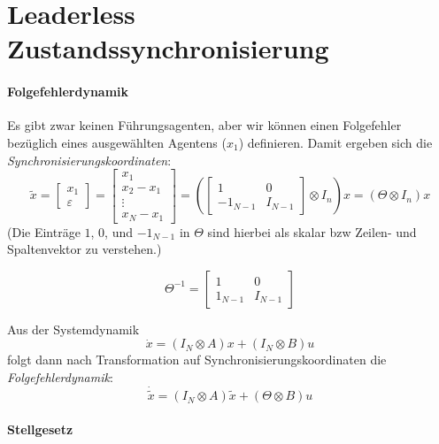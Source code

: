 \section{Leaderless Zustandssynchronisierung}
\paragraph{Folgefehlerdynamik}
Es gibt zwar keinen Führungsagenten, aber wir können einen Folgefehler
bezüglich eines ausgewählten Agentens ($x_1$) definieren.
Damit ergeben sich die \emph{Synchronisierungskoordinaten}:
\begin{equation}
    \tilde{x} = \begin{bmatrix}
        x_1 \\
        \varepsilon
    \end{bmatrix}
    = \begin{bmatrix}
        x_1 \\
        x_2 - x_1 \\
        \vdots \\
        x_N - x_1
    \end{bmatrix}
    = \left(\begin{bmatrix}
        1 & 0 \\
        -1_{N-1} & I_{N-1}
    \end{bmatrix}
    \otimes I_n
    \right) x
    = (\Theta \otimes I_n)x
\end{equation}
(Die Einträge $1$, $0$, und $-1_{N-1}$ in $\Theta$ sind hierbei als skalar bzw Zeilen- und Spaltenvektor zu verstehen.)

\begin{equation}
    \Theta^{-1} = \begin{bmatrix}
        1 & 0 \\
        1_{N-1} & I_{N-1}
    \end{bmatrix}    
\end{equation}

Aus der Systemdynamik
\begin{equation}
    \dot{x} = (I_N \otimes A) x + (I_N \otimes B)u
\end{equation}
folgt dann nach Transformation auf Synchronisierungskoordinaten die
\emph{Folgefehlerdynamik}:
\begin{equation}
    \dot{\tilde{x}} = (I_N \otimes A) \tilde{x} + (\Theta \otimes B)u
\end{equation}

\paragraph{Stellgesetz}

